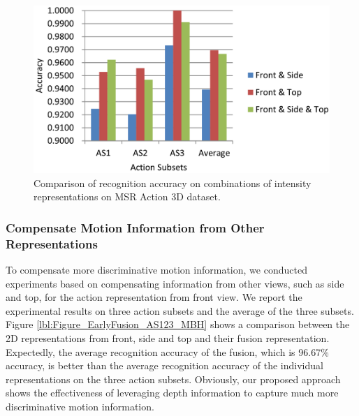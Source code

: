 \documentclass[final,3p,times,twocolumn]{elsarticle}
\begin{document}
\begin{figure}[h]
	\centering
	\includegraphics[width=\columnwidth]{Figures/Chart_RoleOfRepresentations.pdf}
	\caption{\label{Figure_CombinationsFRONTSIDETOP}Comparison of recognition accuracy on combinations of intensity representations on MSR Action 3D dataset.}
\end{figure}

\subsubsection{Compensate Motion Information from Other Representations}

To compensate more discriminative motion information, we conducted experiments based on compensating information from other views, such as side and top, for the action representation from front view.
We report the experimental results on three action subsets and the average of the three subsets.
Figure \ref{lbl:Figure_EarlyFusion_AS123_MBH} shows a comparison between the 2D representations from front, side and top and their fusion representation.
Expectedly, the average recognition accuracy of the fusion, which is 96.67\% accuracy, is better than the average recognition accuracy of the individual representations on the three action subsets.
Obviously, our proposed approach shows the effectiveness of leveraging depth information to capture much more discriminative motion information.

\end{document}
